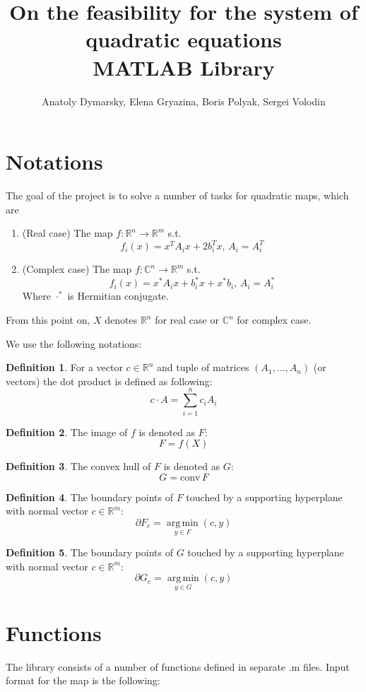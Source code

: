 \documentclass[a4paper]{article}
\title{On the feasibility for the system of quadratic equations\\MATLAB Library}
\date{}
\author{Anatoly Dymarsky, Elena Gryazina, Boris Polyak, Sergei Volodin}
\DeclareMathOperator*{\argmin}{arg\,min}
\newcommand{\conv}{\mbox{conv}\,}
\theoremstyle{definition}
\newtheorem{definition}{Definition}[section]
\begin{document}
\maketitle
\section{Notations}
The goal of the project is to solve a number of tasks for quadratic maps, which are
\begin{enumerate}
\item (Real case) The map $f\colon \mathbb{R}^n\to\mathbb{R}^m$ s.t. $$f_i(x)=x^TA_ix+2b_i^Tx,\, A_i=A_i^T$$
\item (Complex case) The map $f\colon \mathbb{C}^n\to\mathbb{R}^m$ s.t. $$f_i(x)=x^*A_ix+b_i^*x+x^*b_i,\, A_i=A_i^*$$
Where $\cdot^*$ is Hermitian conjugate.
\end{enumerate}

From this point on, $X$ denotes $\mathbb{R}^n$ for real case or $\mathbb{C}^n$ for complex case.

We use the following notations:
\theoremstyle{definition}
\begin{definition} For a vector $c\in\mathbb{R}^n$ and tuple of matrices $(A_1,...,A_n)$ (or vectors) the dot product is defined as following: $$c\cdot A=\sum\limits_{i=1}^nc_iA_i$$
\end{definition}
\begin{definition} The image of $f$ is denoted as $F$:
	$$F=f(X)$$
\end{definition}
\begin{definition} The convex hull of $F$ is denoted as $G$:
	$$G=\conv F$$
\end{definition}
\begin{definition} The boundary points of $F$ touched by a supporting hyperplane with normal vector $c\in\mathbb{R}^m$:
	$$\partial F_c=\argmin\limits_{y\in F}(c,y)$$
\end{definition}
\begin{definition} The boundary points of $G$ touched by a supporting hyperplane with normal vector $c\in\mathbb{R}^m$:
	$$\partial G_c=\argmin\limits_{y\in G}(c,y)$$
\end{definition}
\section{Functions}
The library consists of a number of functions defined in separate .m files. Input format for the map is the following: 
\end{document}

